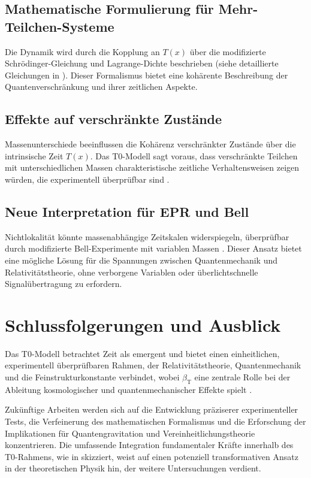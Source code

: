 \documentclass[12pt,a4paper]{article}
\newcommand{\Tfield}{T(x)}
\newcommand{\betaT}{\beta_{\text{T}}}
\begin{document}
	\subsection{Mathematische Formulierung für Mehr-Teilchen-Systeme}
	Die Dynamik wird durch die Kopplung an \(\Tfield\) über die modifizierte Schrödinger-Gleichung und Lagrange-Dichte beschrieben (siehe detaillierte Gleichungen in \cite{pascher_lagrange_2025}). Dieser Formalismus bietet eine kohärente Beschreibung der Quantenverschränkung und ihrer zeitlichen Aspekte.
	
	\subsection{Effekte auf verschränkte Zustände}
	Massenunterschiede beeinflussen die Kohärenz verschränkter Zustände über die intrinsische Zeit \(\Tfield\). Das T0-Modell sagt voraus, dass verschränkte Teilchen mit unterschiedlichen Massen charakteristische zeitliche Verhaltensweisen zeigen würden, die experimentell überprüfbar sind \cite{pascher_feldtheorie_2025}.
	
	\subsection{Neue Interpretation für EPR und Bell}
	Nichtlokalität könnte massenabhängige Zeitskalen widerspiegeln, überprüfbar durch modifizierte Bell-Experimente mit variablen Massen \cite{bell, pascher_photons_2025}. Dieser Ansatz bietet eine mögliche Lösung für die Spannungen zwischen Quantenmechanik und Relativitätstheorie, ohne verborgene Variablen oder überlichtschnelle Signalübertragung zu erfordern.
	
	\section{Schlussfolgerungen und Ausblick}
	Das T0-Modell betrachtet Zeit als emergent und bietet einen einheitlichen, experimentell überprüfbaren Rahmen, der Relativitätstheorie, Quantenmechanik und die Feinstrukturkonstante verbindet, wobei \(\betaT\) eine zentrale Rolle bei der Ableitung kosmologischer und quantenmechanischer Effekte spielt \cite{pascher_galaxies_2025, pascher_alphabeta_2025}.
	
	Zukünftige Arbeiten werden sich auf die Entwicklung präziserer experimenteller Tests, die Verfeinerung des mathematischen Formalismus und die Erforschung der Implikationen für Quantengravitation und Vereinheitlichungstheorie konzentrieren. Die umfassende Integration fundamentaler Kräfte innerhalb des T0-Rahmens, wie in \cite{pascher_grundkraefte_2025} skizziert, weist auf einen potenziell transformativen Ansatz in der theoretischen Physik hin, der weitere Untersuchungen verdient.
	
\end{document}
